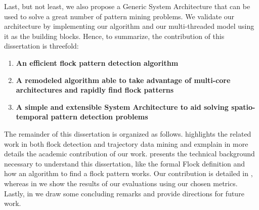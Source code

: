 Last, but not least, we also propose a Generic System Architecture that can be used to solve a great number of pattern
mining problems. We validate our architecture by implementing our algorithm and our multi-threaded model using it as the
building blocks. Hence, to summarize, the contribution of this dissertation is threefold:

\begin{enumerate}
    \item \textbf{An efficient flock pattern detection algorithm}
    \item \textbf{A remodeled algorithm able to take advantage of multi-core architectures and rapidly find flock
        patterns}
    \item \textbf{A simple and extensible System Architecture to aid solving spatio-temporal pattern detection problems}
\end{enumerate}

The remainder of this dissertation is organized as follows.  highlights the related work in
both flock detection and trajectory data mining and exmplain in more details the academic contribution of our work.
 presents the technical background necessary to understand this dissertation, like the
formal Flock definition and how an algorithm to find a flock pattern works. Our contribution is detailed in
, whereas in  we show the results of our evaluations using our chosen
metrics. Lastly, in  we draw some concluding remarks and provide directions for future work.
